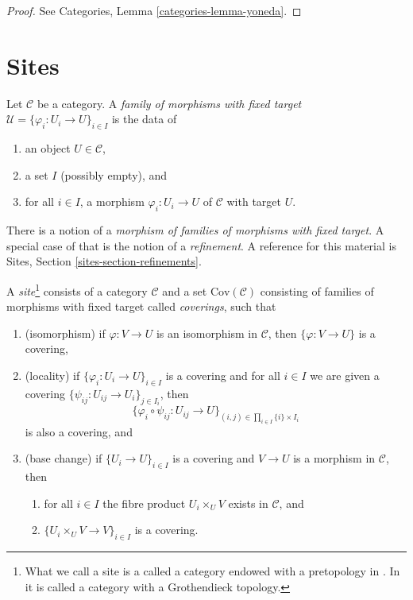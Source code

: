 \begin{proof}
See
Categories, Lemma \ref{categories-lemma-yoneda}.
\end{proof}




\section{Sites}
\label{section-sites}


\begin{definition}
\label{definition-family-morphisms-fixed-target}
Let $\mathcal{C}$ be a category. A {\it family of morphisms with fixed target}
$\mathcal{U} = \{\varphi_i : U_i \to U\}_{i\in I}$ is the data of
\begin{enumerate}
\item an object $U \in \mathcal{C}$,
\item a set $I$ (possibly empty), and
\item for all $i\in I$, a morphism $\varphi_i : U_i \to U$ of $\mathcal{C}$
with target $U$.
\end{enumerate}
\end{definition}

\noindent
There is a notion of a {\it morphism of families of morphisms with fixed
target}. A special case of that is the notion of a {\it refinement}.
A reference for this material is
Sites, Section \ref{sites-section-refinements}.

\begin{definition}
\label{definition-site}
A {\it site}\footnote{What we call a site is a called a category endowed with
a pretopology in \cite[Expos\'e II, D\'efinition 1.3]{SGA4}.
In \cite{ArtinTopologies} it is called a category with a Grothendieck
topology.} consists of a category $\mathcal{C}$ and a set
$\text{Cov}(\mathcal{C})$ consisting of families of morphisms with fixed target
called {\it coverings}, such that
\begin{enumerate}
\item (isomorphism) if $\varphi : V \to U$ is an isomorphism in $\mathcal{C}$,
then $\{\varphi : V \to U\}$ is a covering,
\item (locality) if $\{\varphi_i : U_i \to U\}_{i\in I}$ is a covering and
for all $i \in I$ we are given a covering
$\{\psi_{ij} : U_{ij} \to U_i \}_{j\in I_i}$, then
$$
\{
\varphi_i \circ \psi_{ij} : U_{ij} \to U
\}_{(i, j)\in \prod_{i\in I} \{i\} \times I_i}
$$
is also a covering, and
\item (base change) if $\{U_i \to U\}_{i\in I}$
is a covering and $V \to U$ is a morphism in $\mathcal{C}$, then
\begin{enumerate}
\item for all $i \in I$ the fibre product
$U_i \times_U V$ exists in $\mathcal{C}$, and
\item $\{U_i \times_U V \to V\}_{i\in I}$ is a covering.
\end{enumerate}
\end{enumerate}
\end{definition}

